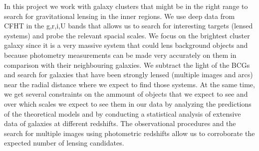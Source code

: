 In this project we work with galaxy clusters that might be in the right range to search for gravitational lensing in the inner regions. We use deep data from CFHT in the g,r,i,U bands that allows us to search for interesting targets (lensed systems) and probe the relevant spacial scales. We focus on the brightest cluster galaxy since it is a very massive system that could lens background objects and because photometry measurements can be made very accurately on them in comparison with their neighbouring galaxies. We subtract the light of the BCGs and search for galaxies that have been strongly lensed (multiple images and arcs) near the radial distance where we expect to find those systems. At the same time, we get several constraints on the ammount of objects that we expect to see and over which scales we expect to see them in our data by analyzing the predictions of the theoretical models and by conducting a statistical analysis of extensive data of galaxies at different redshifts. The observational procedures and the search for multiple images using photometric redshifts allow us to corroborate the expected number of lensing candidates.    

